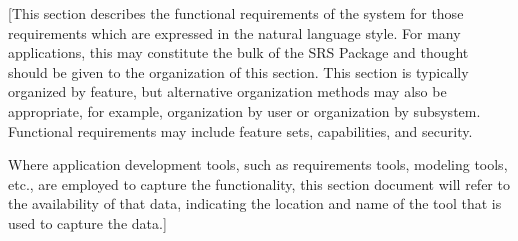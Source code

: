 [This section describes the functional requirements 
of the system for those requirements which are 
expressed in the natural language style. For many
applications, this may constitute the bulk of 
the SRS Package and thought should be given to 
the organization of this section. This section 
is typically organized by feature, but alternative
organization methods may also be appropriate, 
for example, organization by user or organization 
by subsystem.  Functional requirements may include 
feature sets, capabilities, and security.

Where application development tools, such as requirements 
tools, modeling tools, etc., are employed to capture the 
functionality, this section document will refer to the 
availability of that data, indicating the location and 
name of the tool that is used to capture the data.]



